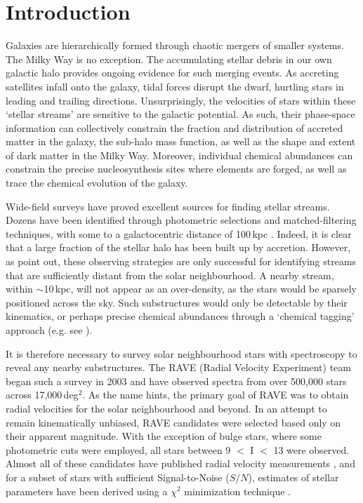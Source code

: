 \documentclass{emulateapj}
\begin{document}

\section{Introduction}
Galaxies are hierarchically formed through chaotic mergers of smaller systems. The Milky Way is no exception. The accumulating stellar debris in our own galactic halo provides ongoing evidence for such merging events. As accreting satellites infall onto the galaxy, tidal forces disrupt the dwarf, hurtling stars in leading and trailing directions. Unsurprisingly, the velocities of stars within these `stellar streams' are sensitive to the galactic potential. As such, their phase-space information can collectively constrain the fraction and distribution of accreted matter in the galaxy, the sub-halo mass function, as well as the shape and extent of dark matter in the Milky Way. Moreover, individual chemical abundances can constrain the  precise nucleosynthesis sites where elements are forged, as well as trace the chemical evolution of the galaxy.

Wide-field surveys have proved excellent sources for finding stellar streams. Dozens have been identified through photometric selections and matched-filtering techniques, with some to a galactocentric distance of 100\,kpc \citep{belokurov;et-al_2007,drake;et-al_2013}. Indeed, it is clear that a large fraction of the stellar halo has been built up by accretion. However, as \citet{helmi;white_1999} point out, these observing strategies are only successful for identifying streams that are sufficiently distant from the solar neighbourhood. A nearby stream, within $\sim$10\,kpc, will not appear as an over-density, as the stars would be sparsely positioned across the sky. Such substructures would only be detectable by their kinematics, or perhaps precise chemical abundances through a `chemical tagging' approach (e.g. see \citet{freeman;bland-hawthorn_2002}). 

It is therefore necessary to survey solar neighbourhood stars with spectroscopy to reveal any nearby substructures. The RAVE (Radial Velocity Experiment) team began such a survey in 2003 and have observed spectra from over 500,000 stars across 17,000\,deg$^{2}$. As the name hints, the primary goal of RAVE was to obtain radial velocities for the solar neighbourhood and beyond. In an attempt to remain kinematically unbiased, RAVE candidates were selected based only on their apparent magnitude. With the exception of bulge stars, where some photometric cuts were employed, all stars between 9 $<$ I $<$ 13 were observed. Almost all of these candidates have published radial velocity measurements \citep{steinmetz;et-al_2006}, and for a subset of stars with sufficient Signal-to-Noise ($S/N$), estimates of stellar parameters have been derived using a $\chi^2$ minimization technique \citep{zwitter;et-al_2008, siebert;et-al_2011}. 
\end{document}
